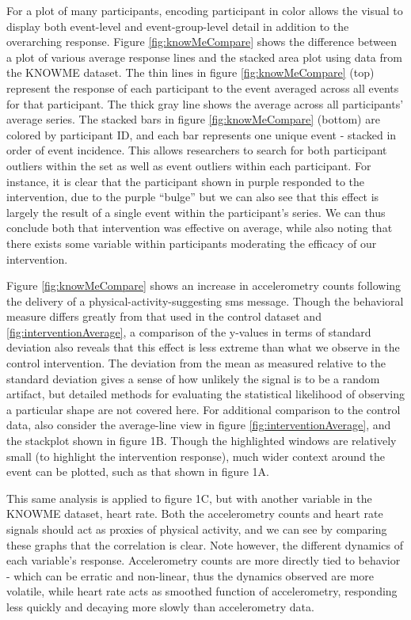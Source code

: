 For a plot of many participants, encoding participant in color allows the visual to display both event-level and event-group-level detail in addition to the overarching response.
Figure \ref{fig:knowMeCompare} shows the difference between a plot of various average response lines and the stacked area plot using data from the KNOWME dataset.
The thin lines in figure \ref{fig:knowMeCompare} (top) represent the response of each participant to the event averaged across all events for that participant.
The thick gray line shows the average across all participants' average series.
The stacked bars in figure \ref{fig:knowMeCompare} (bottom) are colored by participant ID, and each bar represents one unique event - stacked in order of event incidence.
This allows researchers to search for both participant outliers within the set as well as event outliers within each participant.
For instance, it is clear that the participant shown in purple responded to the intervention, due to the purple ``bulge'' but we can also see that this effect is largely the result of a single event within the participant's series.
We can thus conclude both that intervention was effective on average, while also noting that there exists some variable within participants moderating the efficacy of our intervention.

Figure \ref{fig:knowMeCompare} shows an increase in accelerometry counts following the delivery of a physical-activity-suggesting sms message.
Though the behavioral measure differs greatly from that used in the control dataset and \ref{fig:interventionAverage}, a comparison of the y-values in terms of standard deviation also reveals that this effect is less extreme than what we observe in the control intervention.
The deviation from the mean as measured relative to the standard deviation gives a sense of how unlikely the signal is to be a random artifact, but detailed methods for evaluating the statistical likelihood of observing a particular shape are not covered here.
For additional comparison to the control data, also consider the average-line view in figure \ref{fig:interventionAverage}, and the stackplot shown in figure 1B.
Though the highlighted windows are relatively small (to highlight the intervention response), much wider context around the event can be plotted, such as that shown in figure 1A.

This same analysis is applied to figure 1C, but with another variable in the KNOWME dataset, heart rate.
Both the accelerometry counts and heart rate signals should act as proxies of physical activity, and we can see by comparing these graphs that the correlation is clear.
Note however, the different dynamics of each variable's response.
Accelerometry counts are more directly tied to behavior - which can be erratic and non-linear, thus the dynamics observed are more volatile, while heart rate acts as smoothed function of accelerometry, responding less quickly and decaying more slowly than accelerometry data.


